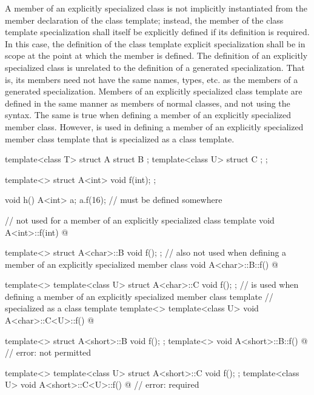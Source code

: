 \pnum
A member of an explicitly specialized class is not implicitly
instantiated from the member declaration of the class template;
instead, the member of the class template specialization shall itself be
explicitly defined if its definition is required.
In this case, the definition of the class template explicit specialization
shall be in scope at the point at which the member is defined.
The definition of an explicitly specialized class is unrelated to the
definition of a generated specialization.
That is, its members need
not have the same names, types, etc. as the members of a generated
specialization.
Members of an explicitly specialized
class template are defined in the same manner as members of normal classes, and
not using the  syntax.
The same is true when defining a member of an explicitly specialized member
class. However,  is used in defining a member of an explicitly
specialized member class template that is specialized as a class template.
\begin{example}

\begin{codeblock}
template<class T> struct A {
  struct B { };
  template<class U> struct C { };
};

template<> struct A<int> {
  void f(int);
};

void h() {
  A<int> a;
  a.f(16);          //  must be defined somewhere
}

//  not used for a member of an explicitly specialized class template
void A<int>::f(int) { @\commentellip@ }

template<> struct A<char>::B {
  void f();
};
//  also not used when defining a member of an explicitly specialized member class
void A<char>::B::f() { @\commentellip@ }

template<> template<class U> struct A<char>::C {
  void f();
};
//  is used when defining a member of an explicitly specialized member class template
// specialized as a class template
template<>
template<class U> void A<char>::C<U>::f() { @\commentellip@ }

template<> struct A<short>::B {
  void f();
};
template<> void A<short>::B::f() { @\commentellip@ }              // error:  not permitted

template<> template<class U> struct A<short>::C {
  void f();
};
template<class U> void A<short>::C<U>::f() { @\commentellip@ }    // error:  required
\end{codeblock}
\end{example}

